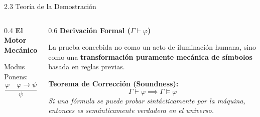 \documentclass[10pt, aspectratio=169]{beamer}
\begin{document}
\begin{frame}{2.3 Teoría de la Demostración}
    \begin{columns}
        \begin{column}{0.4\textwidth}
            \textbf{El Motor Mecánico}
            \vspace{0.5cm}
            
            \large
            Modus Ponens:
            \begin{equation*}
                \frac{\varphi \quad \varphi \to \psi}{\psi}
            \end{equation*}
        \end{column}
        \begin{column}{0.6\textwidth}
            \textbf{Derivación Formal ($\Gamma \vdash \varphi$)}
            
            \vspace{0.3cm}
            \small La prueba concebida no como un acto de iluminación humana, sino como una \textbf{transformación puramente mecánica de símbolos} basada en reglas previas.
            
            \vspace{0.6cm}
            \alert{\textbf{Teorema de Corrección (Soundness):}}
            \begin{equation*}
                \Gamma \vdash \varphi \implies \Gamma \models \varphi
            \end{equation*}
            \footnotesize \textit{Si una fórmula se puede probar sintácticamente por la máquina, entonces es semánticamente verdadera en el universo.}
        \end{column}
    \end{columns}
\end{frame}
\end{document}
